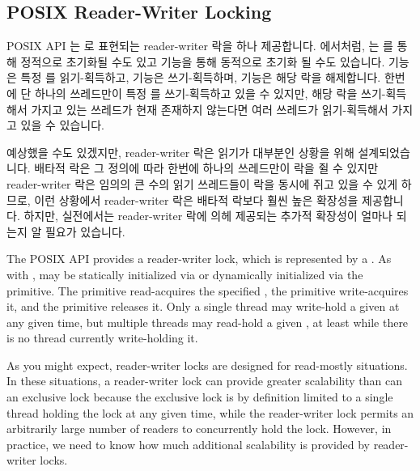 \fi

\subsection{POSIX Reader-Writer Locking}
\label{sec:toolsoftrade:POSIX Reader-Writer Locking}

POSIX API 는  로 표현되는 reader-writer 락을 하나
제공합니다.
 에서처럼,  는
 를 통해 정적으로 초기화될 수도 있고
 기능을 통해 동적으로 초기화 될 수도 있습니다.
 기능은 특정  를
읽기-획득하고,  기능은 쓰기-획득하며,
 기능은 해당 락을 해제합니다.
한번에 단 하나의 쓰레드만이 특정  를 쓰기-획득하고 있을
수 있지만, 해당 락을 쓰기-획득해서 가지고 있는 쓰레드가 현재 존재하지 않는다면
여러 쓰레드가 읽기-획득해서 가지고 있을 수 있습니다.

예상했을 수도 있겠지만, reader-writer 락은 읽기가 대부분인 상황을 위해
설계되었습니다.
배타적 락은 그 정의에 따라 한번에 하나의 쓰레드만이 락을 쥘 수 있지만
reader-writer 락은 임의의 큰 수의 읽기 쓰레드들이 락을 동시에 쥐고 있을 수 있게
하므로, 이런 상황에서 reader-writer 락은 배타적 락보다 훨씬 높은 확장성을
제공합니다.
하지만, 실전에서는 reader-writer 락에 의헤 제공되는 추가적 확장성이 얼마나
되는지 알 필요가 있습니다.

\iffalse

The POSIX API provides a reader-writer lock, which is represented by
a .
As with ,  may be statically
initialized via  or dynamically
initialized via the  primitive.
The  primitive read-acquires the
specified , the 
primitive write-acquires it, and the 
primitive releases it.
Only a single thread may write-hold a given 
at any given time, but multiple threads may read-hold a given
, at least while there is no thread
currently write-holding it.

As you might expect, reader-writer locks are designed for read-mostly
situations.
In these situations, a reader-writer lock can provide greater scalability
than can an exclusive lock because the exclusive lock is by definition
limited to a single thread holding the lock at any given time, while
the reader-writer lock permits
an arbitrarily large number of readers to concurrently hold the lock.
However, in practice, we need to know how much additional scalability is
provided by reader-writer locks.

